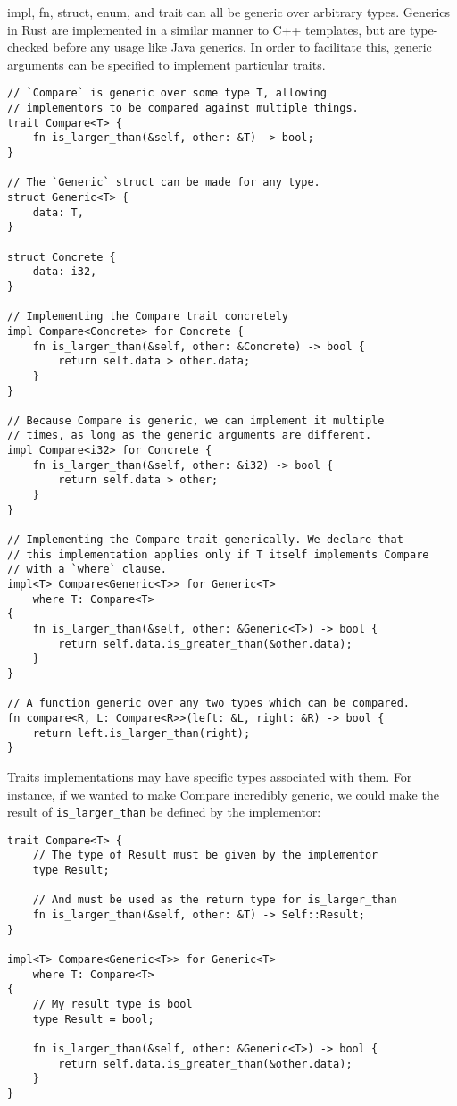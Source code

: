 impl, fn, struct, enum, and trait can all be generic over arbitrary types.
Generics in Rust are implemented in a similar manner to C++ templates, but
are type-checked before any usage like Java generics. In order to facilitate
this, generic arguments can be specified to implement particular traits.

\begin{verbatim}
// `Compare` is generic over some type T, allowing
// implementors to be compared against multiple things.
trait Compare<T> {
    fn is_larger_than(&self, other: &T) -> bool;
}

// The `Generic` struct can be made for any type.
struct Generic<T> {
    data: T,
}

struct Concrete {
    data: i32,
}

// Implementing the Compare trait concretely
impl Compare<Concrete> for Concrete {
    fn is_larger_than(&self, other: &Concrete) -> bool {
        return self.data > other.data;
    }
}

// Because Compare is generic, we can implement it multiple
// times, as long as the generic arguments are different.
impl Compare<i32> for Concrete {
    fn is_larger_than(&self, other: &i32) -> bool {
        return self.data > other;
    }
}

// Implementing the Compare trait generically. We declare that
// this implementation applies only if T itself implements Compare
// with a `where` clause.
impl<T> Compare<Generic<T>> for Generic<T>
    where T: Compare<T>
{
    fn is_larger_than(&self, other: &Generic<T>) -> bool {
        return self.data.is_greater_than(&other.data);
    }
}

// A function generic over any two types which can be compared.
fn compare<R, L: Compare<R>>(left: &L, right: &R) -> bool {
    return left.is_larger_than(right);
}
\end{verbatim}

Traits implementations may have specific types associated with them.
For instance, if we wanted to make Compare incredibly generic, we could
make the result of \texttt{is_larger_than} be defined by the
implementor:

\begin{verbatim}
trait Compare<T> {
    // The type of Result must be given by the implementor
    type Result;

    // And must be used as the return type for is_larger_than
    fn is_larger_than(&self, other: &T) -> Self::Result;
}

impl<T> Compare<Generic<T>> for Generic<T>
    where T: Compare<T>
{
    // My result type is bool
    type Result = bool;

    fn is_larger_than(&self, other: &Generic<T>) -> bool {
        return self.data.is_greater_than(&other.data);
    }
}
\end{verbatim}

